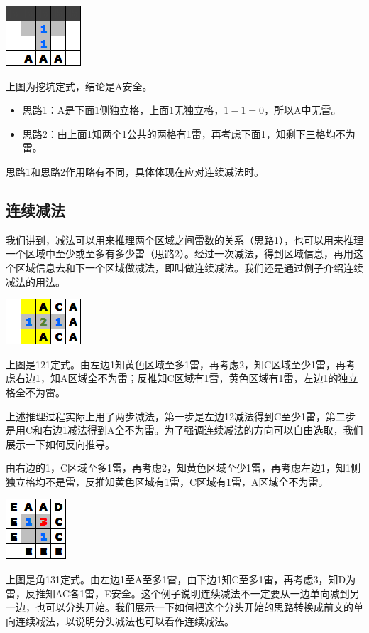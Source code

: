 \vspace{5mm}
\begin{center}
    \includegraphics{trick/减法3.png}
\end{center}
上图为挖坑定式，结论是A安全。
\begin{itemize}
    \item 思路1：A是下面1侧独立格，上面1无独立格，$1-1=0$，所以A中无雷。
    \item 思路2：由上面1知两个1公共的两格有1雷，再考虑下面1，知剩下三格均不为雷。
\end{itemize}

思路1和思路2作用略有不同，具体体现在应对连续减法时。

\subsection{连续减法}
我们讲到，减法可以用来推理两个区域之间雷数的关系（思路1），也可以用来推理一个区域中至少或至多有多少雷（思路2）。经过一次减法，得到区域信息，再用这个区域信息去和下一个区域做减法，即叫做连续减法。我们还是通过例子介绍连续减法的用法。

\vspace{5mm}
\begin{center}
    \includegraphics{trick/减法4.png}
\end{center}
上图是121定式。由左边1知黄色区域至多1雷，再考虑2，知C区域至少1雷，再考虑右边1，知A区域全不为雷；反推知C区域有1雷，黄色区域有1雷，左边1的独立格全不为雷。

上述推理过程实际上用了两步减法，第一步是左边12减法得到C至少1雷，第二步是用C和右边1减法得到A全不为雷。为了强调连续减法的方向可以自由选取，我们展示一下如何反向推导。

由右边的1，C区域至多1雷，再考虑2，知黄色区域至少1雷，再考虑左边1，知1侧独立格均不是雷，反推知黄色区域有1雷，C区域有1雷，A区域全不为雷。

\vspace{5mm}
\begin{center}
    \includegraphics{trick/减法5.png}
\end{center}
上图是角131定式。由左边1至A至多1雷，由下边1知C至多1雷，再考虑3，知D为雷，反推知AC各1雷，E安全。这个例子说明连续减法不一定要从一边单向减到另一边，也可以分头开始。我们展示一下如何把这个分头开始的思路转换成前文的单向连续减法，以说明分头减法也可以看作连续减法。

